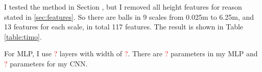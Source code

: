\documentclass{article}
\newcommand{\red}[1]{\textcolor{red}{#1}}
\begin{document}
\begin{table}[h!]
	\centering
	\caption{Remapping of class}
	\label{table:samples}
\end{table}

I tested the method in Section \cite{hackel2016fast}, but I removed all height features for reason stated in \ref{sec:features}. So there are balls in 9 scales from 0.025m to 6.25m, and 13 features for each scale, in total 117 features. The result is shown in Table \ref{table:timo}.

For MLP, I use \red{?} layers with width of \red{?}. There are \red{?} parameters in my MLP and \red{?} parameters for my CNN.
\end{document}
